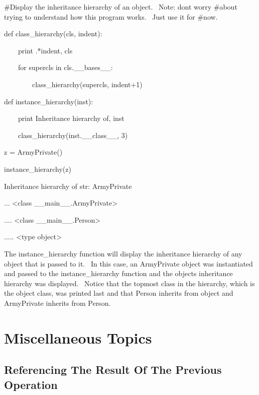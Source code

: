 \documentclass[12pt,twoside]{book}
\begin{document}
\bigskip

\#Display the inheritance hierarchy of an object. \ Note: don{\textquotesingle}t worry \#about trying to understand how this program works. \ Just use it for \#now.

def class\_hierarchy(cls, indent):

\ \ \ \ print {\textquotesingle}.{\textquotesingle}*indent, cls

\ \ \ \ for supercls in cls.\_\_bases\_\_:

\ \ \ \ \ \ \ \ class\_hierarchy(supercls, indent+1)


\bigskip

def instance\_hierarchy(inst):

\ \ \ \ print {\textquotesingle}Inheritance hierarchy of{\textquotesingle}, inst

\ \ \ \ class\_hierarchy(inst.\_\_class\_\_, 3)


\bigskip

z = ArmyPrivate()


\bigskip

instance\_hierarchy(z)

{\textbar}

Inheritance hierarchy of str: ArmyPrivate

... {\textless}class {\textquotesingle}\_\_main\_\_.ArmyPrivate{\textquotesingle}{\textgreater}

.... {\textless}class {\textquotesingle}\_\_main\_\_.Person{\textquotesingle}{\textgreater}

..... {\textless}type {\textquotesingle}object{\textquotesingle}{\textgreater}

The instance\_hierarchy function will display the inheritance hierarchy of any object that is passed to it. \ In this case, an ArmyPrivate object was instantiated and passed to the instance\_hierarchy function and the object{\textquotesingle}s inheritance hierarchy was displayed. \ Notice that the topmost class in the hierarchy, which is the object class, was printed last and that Person inherits from object and ArmyPrivate inherits from Person. 


\bigskip

\chapter[Miscellaneous Topics]{Miscellaneous Topics}

\section[Referencing The Result Of The Previous Operation]{Referencing The Result Of The Previous Operation}
\end{document}
